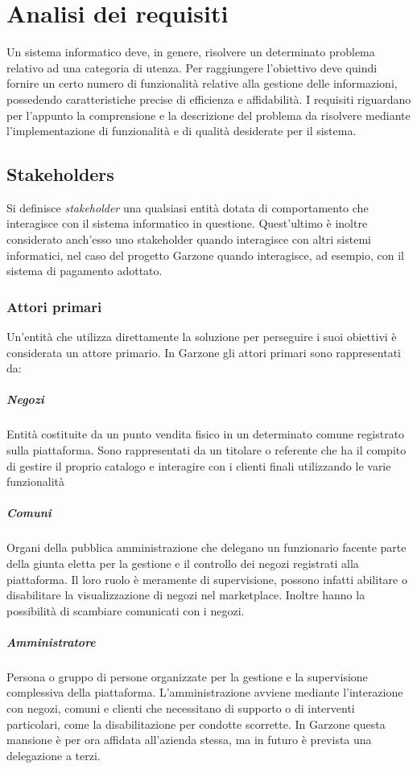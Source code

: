 \chapter{Analisi dei requisiti}
Un sistema informatico deve, in genere, risolvere un determinato problema relativo ad una categoria di utenza. Per raggiungere l'obiettivo deve quindi fornire un certo numero di funzionalità relative alla gestione delle informazioni, possedendo caratteristiche precise di efficienza e affidabilità. I requisiti riguardano per l'appunto la comprensione e la descrizione del problema da risolvere mediante l'implementazione di funzionalità e di qualità desiderate per il sistema.
\section{Stakeholders}
Si definisce \textit{stakeholder} una qualsiasi entità dotata di comportamento che interagisce con il sistema informatico in questione. Quest'ultimo è inoltre considerato anch'esso uno stakeholder quando interagisce con altri sistemi informatici, nel caso del progetto Garzone  quando interagisce, ad esempio, con il sistema di pagamento adottato.
\subsection{Attori primari}
Un'entità che utilizza direttamente la soluzione per perseguire i suoi obiettivi è considerata un attore primario. In Garzone gli attori primari sono rappresentati da:
\paragraph{Negozi} Entità costituite da un punto vendita fisico in un determinato comune registrato sulla piattaforma. Sono rappresentati da un titolare o referente che ha il compito di gestire il proprio catalogo e interagire con i clienti finali utilizzando le varie funzionalità
\paragraph{Comuni} Organi della pubblica amministrazione che delegano un funzionario facente parte della giunta eletta per la gestione e il controllo dei negozi registrati alla piattaforma. Il loro ruolo è meramente di supervisione, possono infatti abilitare o disabilitare la visualizzazione di negozi nel marketplace. Inoltre hanno la possibilità di scambiare comunicati con i negozi.
\paragraph{Amministratore} Persona o gruppo di persone organizzate per la gestione e la supervisione complessiva della piattaforma. L'amministrazione avviene mediante l'interazione con negozi, comuni e clienti che necessitano di supporto o di interventi particolari, come la disabilitazione per condotte scorrette. In Garzone questa mansione è per ora affidata all'azienda stessa, ma in futuro è prevista una delegazione a terzi.
